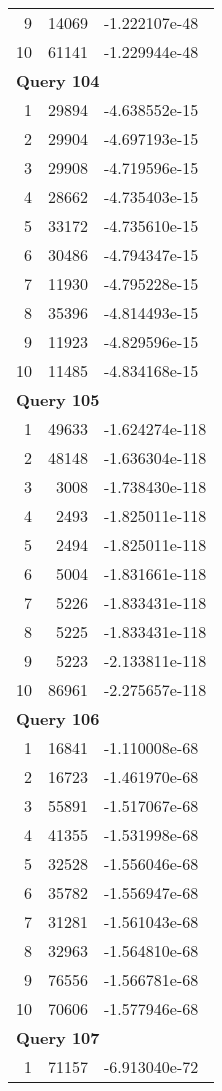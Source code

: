 \begin{longtable}[{p}]{@{}rrp{}@{}}
9 & 14069 & -1.222107e-48 \\
10 & 61141 & -1.229944e-48 \\
\midrule
\multicolumn{3}{l}{\bfseries Query 104} \\
1 & 29894 & -4.638552e-15 \\
2 & 29904 & -4.697193e-15 \\
3 & 29908 & -4.719596e-15 \\
4 & 28662 & -4.735403e-15 \\
5 & 33172 & -4.735610e-15 \\
6 & 30486 & -4.794347e-15 \\
7 & 11930 & -4.795228e-15 \\
8 & 35396 & -4.814493e-15 \\
9 & 11923 & -4.829596e-15 \\
10 & 11485 & -4.834168e-15 \\
\midrule
\multicolumn{3}{l}{\bfseries Query 105} \\
1 & 49633 & -1.624274e-118 \\
2 & 48148 & -1.636304e-118 \\
3 & 3008 & -1.738430e-118 \\
4 & 2493 & -1.825011e-118 \\
5 & 2494 & -1.825011e-118 \\
6 & 5004 & -1.831661e-118 \\
7 & 5226 & -1.833431e-118 \\
8 & 5225 & -1.833431e-118 \\
9 & 5223 & -2.133811e-118 \\
10 & 86961 & -2.275657e-118 \\
\midrule
\multicolumn{3}{l}{\bfseries Query 106} \\
1 & 16841 & -1.110008e-68 \\
2 & 16723 & -1.461970e-68 \\
3 & 55891 & -1.517067e-68 \\
4 & 41355 & -1.531998e-68 \\
5 & 32528 & -1.556046e-68 \\
6 & 35782 & -1.556947e-68 \\
7 & 31281 & -1.561043e-68 \\
8 & 32963 & -1.564810e-68 \\
9 & 76556 & -1.566781e-68 \\
10 & 70606 & -1.577946e-68 \\
\midrule
\multicolumn{3}{l}{\bfseries Query 107} \\
1 & 71157 & -6.913040e-72 \\

\end{longtable}
